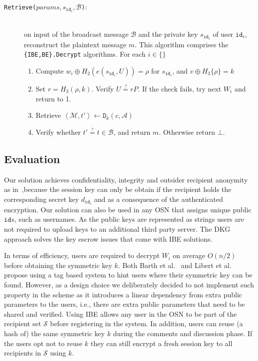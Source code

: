 \documentclass[journal]{IEEEtran}
\newcommand{\id}[1]{\ensuremath{\mathtt{id}_{#1}}}
\begin{document}
\begin{description}
    \bigskip
    
    \item[\texttt{Retrieve($params, s_{\id{i}}, \mathcal{B}$)}:]~\\ on input of the broadcast message $\mathcal{B}$ and the private key $s_{\id{i}}$ of user $\id{i}$, reconstruct the plaintext message $m$. This algorithm comprises the \texttt{\{IBE,BE\}.Decrypt} algorithms. For each $i \in \{  \}$ \\

    \begin{enumerate}
        \item Compute $w_i \oplus H_2 \left( e \left( s_{\id{i}}, U \right) \right) = \rho$ for $s_{\id{i}}$, and $v \oplus H_3 \{ \rho \} = k$ 
        \item Set $r = H_3 \left( \rho, k \right)$. Verify $U \stackrel{?}{=} rP$. If the check fails, try next $W_i$ and return to 1.
        \item Retrieve $\left< \mathcal{M}, t' \right> \leftarrow \mathtt{D}_k(c, \mathcal{A})$
        \item Verify whether $t' \stackrel{?}{=} t \in \mathcal{B} $, and return $m$. Otherwise return $\bot$. 
    \end{enumerate}
\end{description}



\subsection{Evaluation}

Our solution achieves confidentiality, integrity and outsider recipient anonymity as in~\cite{BarthBonehWaters,BonehFranklinIBE,FazioOutsiderANOBE},because the session key can only be obtain if the recipient holds the corresponding secret key $d_{\id{i}}$ and as a consequence of the authenticated encryption. Our solution can also be used in any OSN that assigns unique public \id{}s, such as usernames. As the public keys are represented as strings  users are not required to upload keys to an additional third party server. The DKG approach solves the key escrow issues that come with IBE solutions.

In terms of efficiency, users are required to decrypt $W_i$ on average $O\left( n/2 \right)$ before obtaining the symmetric key $k$. Both Barth et al.~\cite{BarthBonehWaters} and Libert et al.~\cite{LibertANOBE} propose using a tag based system to hint users where their symmetric key can be found. However, as a design choice we deliberately decided to not implement such property in the scheme as it introduces a linear dependency from extra public parameters to the users, i.e., there are extra public parameters that need to be shared and verified. Using IBE allows any user in the OSN to be part of the recipient set $\mathcal{S}$ before registering in the system. In addition, users can reuse (a hash of) the same symmetric key $k$ during the comments and discussion phase. If the users opt not to reuse $k$ they can still encrypt a fresh session key to all recipients in $\mathcal{S}$ using $k$.
\end{document}
